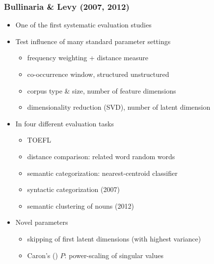\documentclass[t]{beamer} %
\begin{document}
\begin{frame}
  \frametitle{Bullinaria \& Levy (2007, 2012)}

  \ungap[1]
  \begin{itemize}
  \item One of the first systematic evaluation studies
  \item Test influence of many standard parameter settings
    \begin{itemize}
    \item frequency weighting + distance measure
    \item co-occurrence window, structured \vs unstructured
    \item corpus type \& size, number of feature dimensions
    \item dimensionality reduction (SVD), number of latent dimension
    \end{itemize}
  \item<2-> In four different evaluation tasks
    \begin{itemize}
    \item TOEFL
    \item distance comparison: related word  random words
    \item semantic categorization: nearest-centroid classifier
    \item syntactic categorization (2007)
    \item semantic clustering of nouns (2012)
    \end{itemize}
  \item<3-> Novel parameters
    \begin{itemize}
    \item skipping of first latent dimensions (with highest variance)
    \item Caron's (\citeyear{Caron:01}) $P$: power-scaling of singular values
    \end{itemize}
  \end{itemize}
%
%
%
%
%
\end{frame}
\end{document}
